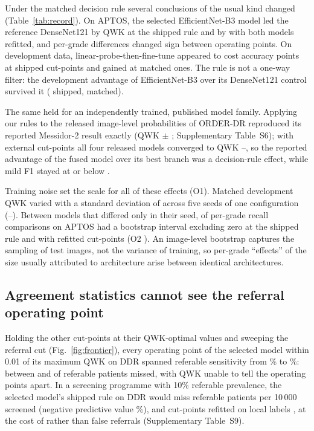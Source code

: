 Under the matched decision rule several conclusions of the usual kind changed
(Table~\ref{tab:record}). On APTOS, the selected EfficientNet-B3 model led the reference DenseNet121 by
 QWK  at the shipped rule and by 
 with both models refitted, and per-grade differences changed sign between
operating points. On development data, linear-probe-then-fine-tune appeared to cost
 accuracy points  at shipped cut-points and gained
  at matched ones. The rule is not a one-way filter: the
development advantage of EfficientNet-B3 over its DenseNet121 control survived it
( shipped,   matched).

The same held for an independently trained, published model family. Applying our rules to the
released image-level probabilities of ORDER-DR\cite{sheng2026orderdr} reproduced its reported
Messidor-2 result exactly (QWK  $\pm$ ; Supplementary
Table~S6); with external cut-points all four released models converged to QWK
--, so the reported advantage of the fused model over its
best branch was a decision-rule effect, while mild F1 stayed at or below .

Training noise set the scale for all of these effects (O1). Matched development QWK varied with
a standard deviation of  across five seeds of one configuration
(--). Between models that differed only in their seed,
 of  per-grade recall comparisons on APTOS had a
bootstrap interval excluding zero at the shipped rule and  with refitted
cut-points (O2 ). An image-level bootstrap captures the sampling of test images, not
the variance of training, so per-grade ``effects'' of the size usually attributed to architecture
arise between identical architectures.

\subsection{Agreement statistics cannot see the referral operating point}

Holding the other cut-points at their QWK-optimal values and sweeping the referral cut
(Fig.~\ref{fig:frontier}), every operating point of the selected model within 0.01 of its maximum
QWK on DDR spanned referable sensitivity from \% to
\%: between  and
 of  referable patients missed, with QWK
unable to tell the operating points apart. In a screening programme with 10\% referable
prevalence, the selected model's shipped rule on DDR would miss 
referable patients per 10\,000 screened (negative predictive value \%),
and cut-points refitted on local labels , at the cost of
 rather than  false referrals
(Supplementary Table~S9).

